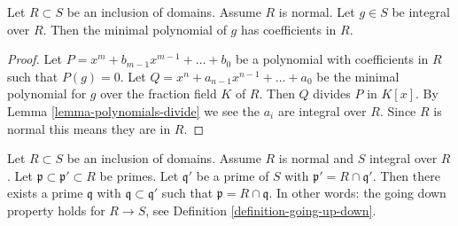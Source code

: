 \begin{lemma}
\label{lemma-minimal-polynomial-normal-domain}
Let $R \subset S$ be an inclusion of domains.
Assume $R$ is normal. Let $g \in S$ be integral
over $R$. Then the minimal polynomial of $g$
has coefficients in $R$.
\end{lemma}

\begin{proof}
Let $P = x^m + b_{m-1} x^{m-1} + \ldots + b_0$
be a polynomial with coefficients in $R$
such that $P(g) = 0$. Let $Q = x^n + a_{n-1}x^{n-1} + \ldots + a_0$
be the minimal polynomial for $g$ over the fraction field
$K$ of $R$. Then $Q$ divides $P$ in $K[x]$. By Lemma
\ref{lemma-polynomials-divide} we see the $a_i$ are
integral over $R$. Since $R$ is normal this
means they are in $R$.
\end{proof}

\begin{proposition}
\label{proposition-going-down-normal-integral}
Let $R \subset S$ be an inclusion of domains.
Assume $R$ is normal and $S$ integral over $R$.
Let $\mathfrak p \subset \mathfrak p' \subset R$
be primes. Let $\mathfrak q'$ be a prime of $S$
with $\mathfrak p' = R \cap \mathfrak q'$.
Then there exists a prime $\mathfrak q$
with $\mathfrak q \subset \mathfrak q'$
such that $\mathfrak p = R \cap \mathfrak q$. In other words:
the going down property holds for $R \to S$, see
Definition \ref{definition-going-up-down}.
\end{proposition}

